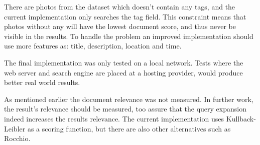 There are photos from the dataset which doesn't contain any tags,
and the current implementation only searches the tag field.
This constraint means that photos without any will have the lowest document score, and thus never be visible in the results.
To handle the problem an improved implementation should use more features as: title, description, location and time.

The final implementation was only tested on a local network.
Tests where the web server and search engine are placed at a hosting provider,
would produce better real world results.

As mentioned earlier the document relevance was not measured.
In further work, the result's relevance should be measured, too assure that the query expansion indeed increases the results relevance.
The current implementation uses Kullback-Leibler as a scoring function, but there are also other alternatives such as Rocchio.
